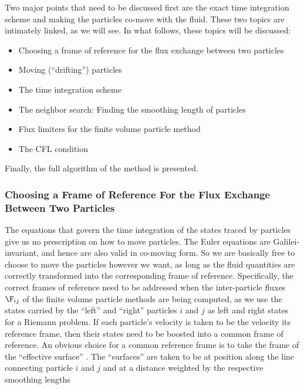 Two major points that need to be discussed first are the exact time integration scheme and making
the particles co-move with the fluid. These two topics are intimately linked, as we will see. In
what follows, these topics will be discussed:

\begin{itemize}
 \item Choosing a frame of reference for the flux exchange between two particles
 \item Moving (``drifting'') particles
 \item The time integration scheme
 \item The neighbor search: Finding the smoothing length of particles
 \item Flux limiters for the finite volume particle method
 \item The CFL condition
\end{itemize}

Finally, the full algorithm of the method is presented.







\subsubsection{Choosing a Frame of Reference For the Flux Exchange Between Two Particles}



The equations that govern the time integration of the states traced by particles give us no
prescription on how to move particles. The Euler equations are Galilei-invariant, and hence are also
valid in co-moving form. So we are basically free to choose to move the particles however we want,
as long as the fluid quantities are correctly transformed into the corresponding frame of reference.
Specifically, the correct frames of reference need to be addressed when the inter-particle fluxes
$\F_{ij}$ of the finite volume particle methods are being computed, as we use the states carried by
the ``left'' and ``right'' particles $i$ and $j$ as left and right states for a Riemann problem. If
each particle's velocity is taken to be the velocity its reference frame, then their states need to
be boosted into a common frame of reference. An obvious choice for a common reference frame is to
take the frame of the ``effective surface'' \Aij. The ``surfaces'' are taken to be at position along
the line connecting particle $i$ and $j$ and at a distance weighted by the respective smoothing
lengths

